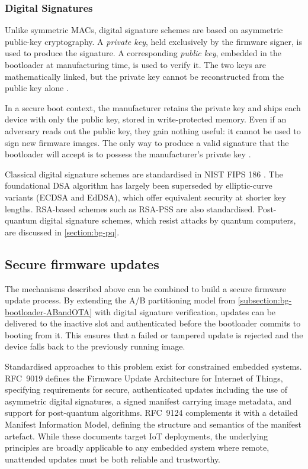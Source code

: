 \subsubsection{Digital Signatures}
\label{subsubsection:bg-secureboot-verification-signature}

Unlike symmetric MACs, digital signature schemes are based on asymmetric public-key cryptography. A \emph{private key}, held exclusively by the firmware signer, is used to produce the signature. A corresponding \emph{public key}, embedded in the bootloader at manufacturing time, is used to verify it. The two keys are mathematically linked, but the private key cannot be reconstructed from the public key alone \cite{digital_signature_standard}.

In a secure boot context, the manufacturer retains the private key and ships each device with only the public key, stored in write-protected memory. Even if an adversary reads out the public key, they gain nothing useful: it cannot be used to sign new firmware images. The only way to produce a valid signature that the bootloader will accept is to possess the manufacturer's private key \cite{digital_signature_standard, ccsds_crypto_algorithms}.

Classical digital signature schemes are standardised in NIST FIPS 186 \cite{digital_signature_standard}. The foundational DSA algorithm has largely been superseded by elliptic-curve variants (ECDSA and EdDSA), which offer equivalent security at shorter key lengths. RSA-based schemes such as RSA-PSS are also standardised. Post-quantum digital signature schemes, which resist attacks by quantum computers, are discussed in \autoref{section:bg-pq}.

\subsection{Secure firmware updates}
\label{subsection:bg-secureboot-manifest}

The mechanisms described above can be combined to build a secure firmware update process. By extending the A/B partitioning model from \autoref{subsection:bg-bootloader-ABandOTA} with digital signature verification, updates can be delivered to the inactive slot and authenticated before the bootloader commits to booting from it. This ensures that a failed or tampered update is rejected and the device falls back to the previously running image.

Standardised approaches to this problem exist for constrained embedded systems. RFC~9019 \cite{rfc9019} defines the Firmware Update Architecture for Internet of Things, specifying requirements for secure, authenticated updates including the use of asymmetric digital signatures, a signed manifest carrying image metadata, and support for post-quantum algorithms. RFC~9124 \cite{rfc9124} complements it with a detailed Manifest Information Model, defining the structure and semantics of the manifest artefact. While these documents target IoT deployments, the underlying principles are broadly applicable to any embedded system where remote, unattended updates must be both reliable and trustworthy.

